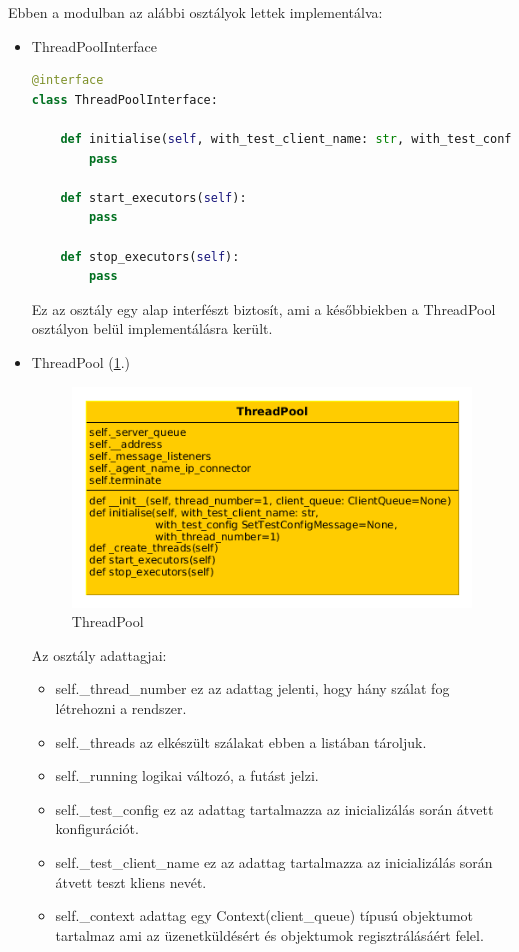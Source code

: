 \documentclass[a4paper,12pt,oneside]{report}
\begin{document}
Ebben a modulban az alábbi osztályok lettek implementálva:
\begin{itemize}
    \itemsep0em
        \item ThreadPoolInterface
        
\begin{lstlisting}[language=Python]
@interface
class ThreadPoolInterface:

    def initialise(self, with_test_client_name: str, with_test_config: SetTestConfigMessage=None, with_thread_number=1):
        pass

    def start_executors(self):
        pass

    def stop_executors(self):
        pass

\end{lstlisting}

Ez az osztály egy alap interfészt biztosít, ami a későbbiekben a ThreadPool osztályon belül implementálásra került.

        \item ThreadPool (\ref{fig:threadpool}.)
        
        \begin{figure}[h]
              \includegraphics[width=13cm,keepaspectratio]{threadpool.png}
              \caption{ThreadPool}
              \label{fig:threadpool}
            \end{figure}
            \newpage
        Az osztály adattagjai:
            \begin{itemize}
                \itemsep0em
                    \item self.\_thread\_number ez az adattag jelenti, hogy hány szálat fog létrehozni a rendszer.
                    \item self.\_threads az elkészült szálakat ebben a listában tároljuk.
                    \item self.\_running logikai változó, a futást jelzi.
                    \item self.\_test\_config ez az adattag tartalmazza az inicializálás során átvett konfigurációt.
                    \item self.\_test\_client\_name ez az adattag tartalmazza az inicializálás során átvett teszt kliens nevét.
                    \item self.\_context adattag egy Context(client\_queue) típusú objektumot tartalmaz ami az üzenetküldésért és objektumok regisztrálásáért felel.
            \end{itemize}


\end{itemize}
\end{document}
